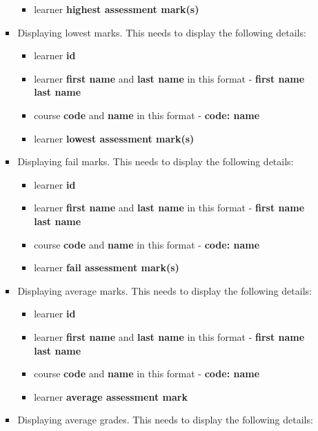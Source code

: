 \documentclass{article}
\begin{document}
\begin{itemize}
\begin{itemize}
\begin{itemize}
\begin{itemize}
                \item learner \textbf{highest assessment mark(s)}
            \end{itemize}
            \item Displaying lowest marks. This needs to display the following details:
            \begin{itemize}
                \item learner \textbf{id}
                \item learner \textbf{first name} and \textbf{last name} in this format - \textbf{first name last name}
                \item course \textbf{code} and \textbf{name} in this format - \textbf{code: name}
                \item learner \textbf{lowest assessment mark(s)}
            \end{itemize}
            \item Displaying fail marks. This needs to display the following details:
            \begin{itemize}
                \item learner \textbf{id}
                \item learner \textbf{first name} and \textbf{last name} in this format - \textbf{first name last name}
                \item course \textbf{code} and \textbf{name} in this format - \textbf{code: name}
                \item learner \textbf{fail assessment mark(s)}
            \end{itemize}
            \item Displaying average marks. This needs to display the following details:
            \begin{itemize}
                \item learner \textbf{id}
                \item learner \textbf{first name} and \textbf{last name} in this format - \textbf{first name last name}
                \item course \textbf{code} and \textbf{name} in this format - \textbf{code: name}
                \item learner \textbf{average assessment mark}
            \end{itemize}
            \item Displaying average grades. This needs to display the following details:
            \begin{itemize}

\end{itemize}
\end{itemize}
\end{itemize}
\end{itemize}
\end{document}
